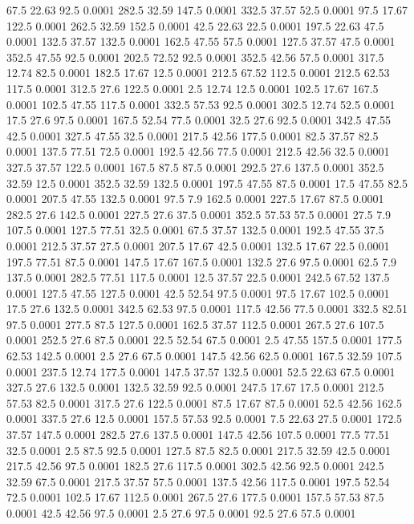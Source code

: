 67.5	22.63	92.5	0.0001
282.5	32.59	147.5	0.0001
332.5	37.57	52.5	0.0001
97.5	17.67	122.5	0.0001
262.5	32.59	152.5	0.0001
42.5	22.63	22.5	0.0001
197.5	22.63	47.5	0.0001
132.5	37.57	132.5	0.0001
162.5	47.55	57.5	0.0001
127.5	37.57	47.5	0.0001
352.5	47.55	92.5	0.0001
202.5	72.52	92.5	0.0001
352.5	42.56	57.5	0.0001
317.5	12.74	82.5	0.0001
182.5	17.67	12.5	0.0001
212.5	67.52	112.5	0.0001
212.5	62.53	117.5	0.0001
312.5	27.6	122.5	0.0001
2.5	12.74	12.5	0.0001
102.5	17.67	167.5	0.0001
102.5	47.55	117.5	0.0001
332.5	57.53	92.5	0.0001
302.5	12.74	52.5	0.0001
17.5	27.6	97.5	0.0001
167.5	52.54	77.5	0.0001
32.5	27.6	92.5	0.0001
342.5	47.55	42.5	0.0001
327.5	47.55	32.5	0.0001
217.5	42.56	177.5	0.0001
82.5	37.57	82.5	0.0001
137.5	77.51	72.5	0.0001
192.5	42.56	77.5	0.0001
212.5	42.56	32.5	0.0001
327.5	37.57	122.5	0.0001
167.5	87.5	87.5	0.0001
292.5	27.6	137.5	0.0001
352.5	32.59	12.5	0.0001
352.5	32.59	132.5	0.0001
197.5	47.55	87.5	0.0001
17.5	47.55	82.5	0.0001
207.5	47.55	132.5	0.0001
97.5	7.9	162.5	0.0001
227.5	17.67	87.5	0.0001
282.5	27.6	142.5	0.0001
227.5	27.6	37.5	0.0001
352.5	57.53	57.5	0.0001
27.5	7.9	107.5	0.0001
127.5	77.51	32.5	0.0001
67.5	37.57	132.5	0.0001
192.5	47.55	37.5	0.0001
212.5	37.57	27.5	0.0001
207.5	17.67	42.5	0.0001
132.5	17.67	22.5	0.0001
197.5	77.51	87.5	0.0001
147.5	17.67	167.5	0.0001
132.5	27.6	97.5	0.0001
62.5	7.9	137.5	0.0001
282.5	77.51	117.5	0.0001
12.5	37.57	22.5	0.0001
242.5	67.52	137.5	0.0001
127.5	47.55	127.5	0.0001
42.5	52.54	97.5	0.0001
97.5	17.67	102.5	0.0001
17.5	27.6	132.5	0.0001
342.5	62.53	97.5	0.0001
117.5	42.56	77.5	0.0001
332.5	82.51	97.5	0.0001
277.5	87.5	127.5	0.0001
162.5	37.57	112.5	0.0001
267.5	27.6	107.5	0.0001
252.5	27.6	87.5	0.0001
22.5	52.54	67.5	0.0001
2.5	47.55	157.5	0.0001
177.5	62.53	142.5	0.0001
2.5	27.6	67.5	0.0001
147.5	42.56	62.5	0.0001
167.5	32.59	107.5	0.0001
237.5	12.74	177.5	0.0001
147.5	37.57	132.5	0.0001
52.5	22.63	67.5	0.0001
327.5	27.6	132.5	0.0001
132.5	32.59	92.5	0.0001
247.5	17.67	17.5	0.0001
212.5	57.53	82.5	0.0001
317.5	27.6	122.5	0.0001
87.5	17.67	87.5	0.0001
52.5	42.56	162.5	0.0001
337.5	27.6	12.5	0.0001
157.5	57.53	92.5	0.0001
7.5	22.63	27.5	0.0001
172.5	37.57	147.5	0.0001
282.5	27.6	137.5	0.0001
147.5	42.56	107.5	0.0001
77.5	77.51	32.5	0.0001
2.5	87.5	92.5	0.0001
127.5	87.5	82.5	0.0001
217.5	32.59	42.5	0.0001
217.5	42.56	97.5	0.0001
182.5	27.6	117.5	0.0001
302.5	42.56	92.5	0.0001
242.5	32.59	67.5	0.0001
217.5	37.57	57.5	0.0001
137.5	42.56	117.5	0.0001
197.5	52.54	72.5	0.0001
102.5	17.67	112.5	0.0001
267.5	27.6	177.5	0.0001
157.5	57.53	87.5	0.0001
42.5	42.56	97.5	0.0001
2.5	27.6	97.5	0.0001
92.5	27.6	57.5	0.0001
